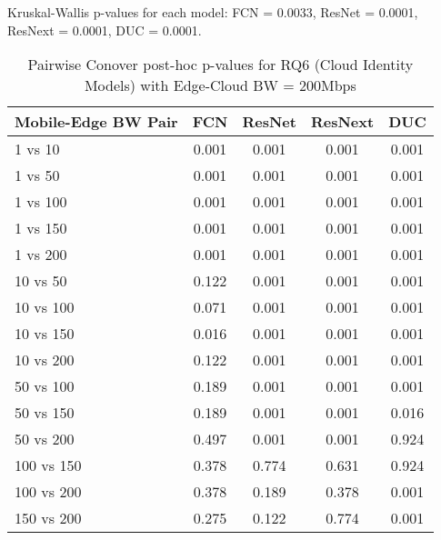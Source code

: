 \begin{table}[h]
\centering
\caption{Pairwise Conover post-hoc p-values for RQ6 (Cloud Identity Models) with Edge-Cloud BW = 200Mbps}
\label{tab:conover_cloud_identity_ec200}
\smallskip
Kruskal-Wallis p-values for each model: FCN = 0.0033, ResNet = 0.0001, ResNext = 0.0001, DUC = 0.0001.

\begin{tabular}{lcccc}
\toprule
Mobile-Edge BW Pair & FCN & ResNet & ResNext & DUC \\
\midrule
1 vs 10 & 0.001 & 0.001 & 0.001 & 0.001 \\
1 vs 50 & 0.001 & 0.001 & 0.001 & 0.001 \\
1 vs 100 & 0.001 & 0.001 & 0.001 & 0.001 \\
1 vs 150 & 0.001 & 0.001 & 0.001 & 0.001 \\
1 vs 200 & 0.001 & 0.001 & 0.001 & 0.001 \\
10 vs 50 & 0.122 & 0.001 & 0.001 & 0.001 \\
10 vs 100 & 0.071 & 0.001 & 0.001 & 0.001 \\
10 vs 150 & 0.016 & 0.001 & 0.001 & 0.001 \\
10 vs 200 & 0.122 & 0.001 & 0.001 & 0.001 \\
50 vs 100 & 0.189 & 0.001 & 0.001 & 0.001 \\
50 vs 150 & 0.189 & 0.001 & 0.001 & 0.016 \\
50 vs 200 & 0.497 & 0.001 & 0.001 & 0.924 \\
100 vs 150 & 0.378 & 0.774 & 0.631 & 0.924 \\
100 vs 200 & 0.378 & 0.189 & 0.378 & 0.001 \\
150 vs 200 & 0.275 & 0.122 & 0.774 & 0.001 \\
\bottomrule
\end{tabular}
\end{table}

